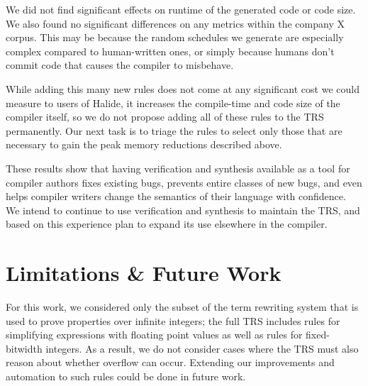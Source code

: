 \documentclass[acmsmall,review,anonymous]{acmart}\settopmatter{printfolios=true,printccs=false,printacmref=false}
\newcommand{\hmax}[0]{\texttt{max}}
\newcommand{\hmin}[0]{\texttt{min}}
\newcommand{\rewrites}[0]{\:\rightarrow_{R}\:}
\begin{document}
We did not find significant effects on runtime of the generated code or code size. We also found no significant differences on any metrics within the company X corpus. This may be because the random schedules we generate are especially complex compared to human-written ones, or simply because humans don’t commit code that causes the compiler to misbehave.

While adding this many new rules does not come at any significant cost we could measure to users of Halide, it increases the compile-time and code size of the compiler itself, so we do not propose adding all of these rules to the TRS permanently. Our next task is to triage the rules to select only those that are necessary to gain the peak memory reductions described above.

These results show that having verification and synthesis available as a tool for compiler authors fixes existing bugs, prevents entire classes of new bugs, and even helps compiler writers change the semantics of their language with confidence. We intend to continue to use verification and synthesis to maintain the TRS, and based on this experience plan to expand its use elsewhere in the compiler.






\section{Limitations \& Future Work}
\label{sec:limitations}
For this work, we considered only the subset of the term rewriting system that
is used to prove properties over infinite integers; the full TRS includes rules
for simplifying expressions with floating point values as well as rules for
fixed-bitwidth integers.  As a result, we do not consider cases where the TRS
must also reason about whether overflow can occur.  Extending our improvements
and automation to such rules could be done in future work.
\end{document}

